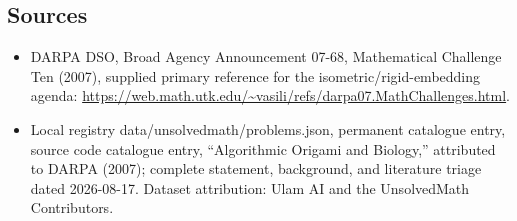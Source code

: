 \documentclass[11pt]{article}
\begin{document}
\subsection{Sources}
\begin{itemize}
\item DARPA DSO, Broad Agency Announcement 07-68, Mathematical Challenge Ten (2007), supplied primary reference for the isometric/rigid-embedding agenda: \url{https://web.math.utk.edu/~vasili/refs/darpa07.MathChallenges.html}.
\item Local registry data/unsolvedmath/problems.json, permanent catalogue entry, source code catalogue entry, ``Algorithmic Origami and Biology,'' attributed to DARPA (2007); complete statement, background, and literature triage dated 2026-08-17. Dataset attribution: Ulam AI and the UnsolvedMath Contributors.
\end{itemize}
\end{document}
